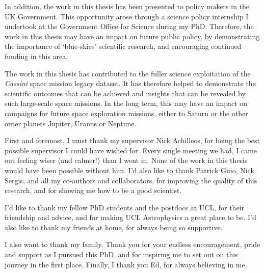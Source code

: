 \begin{impactstatement}
In addition, the work in this thesis has been presented to policy makers in the UK Government. This opportunity arose through a science policy internship I undertook at the Government Office for Science during my PhD. Therefore, the work in this thesis may have an impact on future public policy, by demonstrating the importance of `blue-skies’ scientific research, and encouraging continued funding in this area.

The work in this thesis has contributed to the fuller science exploitation of the \textit{Cassini} space mission legacy dataset. It has therefore helped to demonstrate the scientific outcomes that can be achieved and insights that can be revealed by such large-scale space missions. In the long term, this may have an impact on campaigns for future space exploration missions, either to Saturn or the other outer planets Jupiter, Uranus or Neptune.

\end{impactstatement}

\begin{acknowledgements}
First and foremost, I must thank my supervisor Nick Achilleos, for being the best possible supervisor I could have wished for. Every single meeting we had, I came out feeling wiser (and calmer!) than I went in. None of the work in this thesis would have been possible without him. I'd also like to thank Patrick Guio, Nick Sergis, and all my co-authors and collaborators, for improving the quality of this research, and for showing me how to be a good scientist.

I'd like to thank my fellow PhD students and the postdocs at UCL, for their friendship and advice, and for making UCL Astrophysics a great place to be. I'd also like to thank my friends at home, for always being so supportive.

I also want to thank my family. Thank you for your endless encouragement, pride and support as I pursued this PhD, and for inspiring me to set out on this journey in the first place. Finally, I thank you Ed, for always believing in me.
\end{acknowledgements}

\setcounter{tocdepth}{2} 

\tableofcontents

\cleardoublepage %
{}

\listoffigures

\cleardoublepage %
{}

\listoftables

